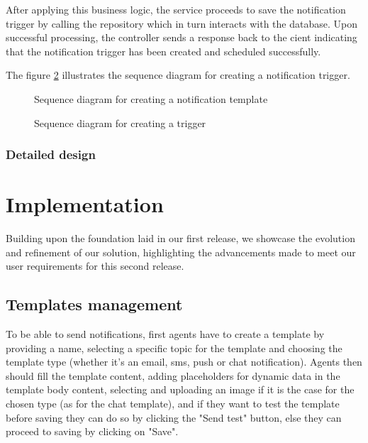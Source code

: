 After applying this business logic, the service proceeds to save the notification trigger by calling
the repository which in turn interacts with the database. Upon successful processing, the controller sends
a response back to the cient indicating that the notification trigger has been created and scheduled successfully.

\noindent The figure \ref{seq-create-trigger} illustrates the sequence diagram for creating a notification trigger.

\begin{landscape}
    \begin{figure}[hbt!]
        \centering
        
        \caption{Sequence diagram for creating a notification template}
        \label{seq-create-template}
    \end{figure}
\end{landscape}

\begin{landscape}
    \begin{figure}[hbt!]
        \centering
        
        \caption{Sequence diagram for creating a trigger}
        \label{seq-create-trigger}
    \end{figure}
\end{landscape}


\subsubsection{Detailed design}

\section{Implementation}
Building upon the foundation laid in our first release, we showcase the evolution and refinement of
our solution, highlighting the advancements made to meet our user requirements for this second release.

\subsection{Templates management}
To be able to send notifications, first agents have to create a template by providing a name, selecting
a specific topic for the template and choosing the template type (whether it's an email, sms, push or
chat notification). Agents then should fill the template content, adding placeholders for dynamic data
in the template body content, selecting and uploading an image if it is the case for the chosen type
(as for the chat template), and if they want to test the template before saving they can do so by
clicking the "Send test" button, else they can proceed to saving by clicking on "Save".

